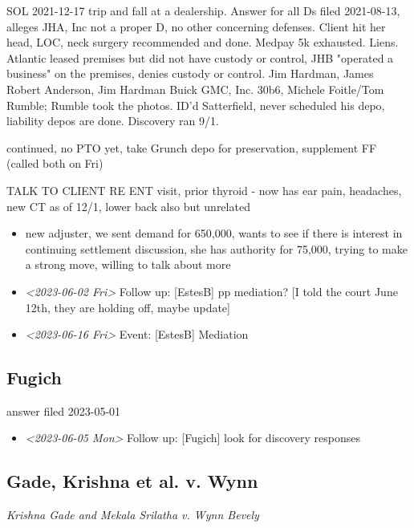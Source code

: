 \documentclass[11pt]{article}
\begin{document}
SOL 2021-12-17 trip and fall at a dealership. Answer for all Ds filed 2021-08-13, alleges JHA, Inc not a proper D, no other concerning defenses. Client hit her head, LOC, neck surgery recommended and done. Medpay 5k exhausted. Liens. Atlantic leased premises but did not have custody or control, JHB "operated a business" on the premises, denies custody or control. Jim Hardman, James Robert Anderson, Jim Hardman Buick GMC, Inc. 30b6, Michele Foitle/Tom Rumble; Rumble took the photos. ID'd Satterfield, never scheduled his depo, liability depos are done. Discovery ran 9/1.

continued, no PTO yet, take Grunch depo for preservation, supplement FF (called both on Fri)

TALK TO CLIENT RE ENT visit, prior thyroid - now has ear pain, headaches, new CT as of 12/1, lower back also but unrelated

\begin{itemize}
\item new adjuster, we sent demand for 650,000, wants to see if there is interest in continuing settlement discussion, she has authority for 75,000, trying to make a strong move, willing to talk about more

\item \textit{<2023-06-02 Fri> } Follow up: [EstesB] pp mediation? [I told the court June 12th, they are holding off, maybe update]

\item \textit{<2023-06-16 Fri> } Event: [EstesB] Mediation
\end{itemize}

\subsection*{Fugich}
\label{sec:org0968c31}

answer filed 2023-05-01

\begin{itemize}
\item \textit{<2023-06-05 Mon> } Follow up: [Fugich] look for discovery responses
\end{itemize}

\subsection*{Gade, Krishna et al. v. Wynn}
\label{sec:org54b57ce}

\emph{Krishna Gade and Mekala Srilatha v. Wynn Bevely}
\end{document}
